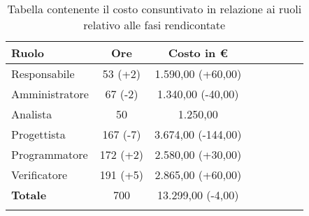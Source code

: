 \begin{longtable}{|l|c|c|c|c|c|c|c|}
	\hline
	\rowcolor{lighter-grayer}
	\textbf{Ruolo}  & \textbf{Ore} & \textbf{Costo in €} \\
	\hline
	\endfirsthead

	\hline
	Responsabile    & 53 (+2)           & 1.590,00 (+60,00)           \\
	\hline
	\hline
	Amministratore  & 67 (-2)           & 1.340,00 (-40,00)           \\
	\hline
	\hline
	Analista        & 50           & 1.250,00            \\
	\hline
	\hline
	Progettista     & 167 (-7)          & 3.674,00 (-144,00)           \\
	\hline
	\hline
	Programmatore   & 172 (+2)         & 2.580,00 (+30,00)           \\
	\hline
	\hline
	Verificatore    & 191 (+5)         & 2.865,00 (+60,00)           \\
	\hline
	\hline
	\textbf{Totale} & 700          & 13.299,00 (-4,00)           \\
	\hline
	\rowcolor{white}
	\caption{Tabella contenente il costo consuntivato in relazione ai ruoli relativo alle fasi rendicontate}
\end{longtable}

